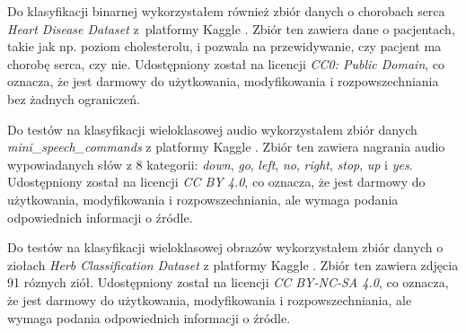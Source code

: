 Do klasyfikacji binarnej wykorzystałem również zbiór danych o chorobach serca \textit{Heart Disease Dataset} z~platformy Kaggle \cite{yasser2021heart}. Zbiór ten zawiera dane o pacjentach, takie jak np. poziom cholesterolu, i pozwala na przewidywanie, czy pacjent ma chorobę serca, czy nie. Udostępniony został na licencji \textit{CC0: Public Domain}, co oznacza, że jest darmowy do użytkowania, modyfikowania i rozpowszechniania bez żadnych ograniczeń.

Do testów na klasyfikacji wieloklasowej audio wykorzystałem zbiór danych \textit{mini\_speech\_commands} z platformy Kaggle \cite{antfilatov2022mini}. Zbiór ten zawiera nagrania audio wypowiadanych słów z 8 kategorii: \textit{down}, \textit{go}, \textit{left}, \textit{no}, \textit{right}, \textit{stop}, \textit{up} i \textit{yes}. Udostępniony został na licencji \textit{CC BY 4.0}, co oznacza, że jest darmowy do użytkowania, modyfikowania i rozpowszechniania, ale wymaga podania odpowiednich informacji o źródle.

Do testów na klasyfikacji wieloklasowej obrazów wykorzystałem zbiór danych o ziołach \textit{Herb Classification Dataset} z platformy Kaggle \cite{ai4a2025herb,Sheth2025Herbify}. Zbiór ten zawiera zdjęcia 91 róznych ziół. 
Udostępniony został na licencji \textit{CC BY-NC-SA 4.0}, co oznacza, że jest darmowy do użytkowania, modyfikowania i rozpowszechniania, ale wymaga podania odpowiednich informacji o źródle.


